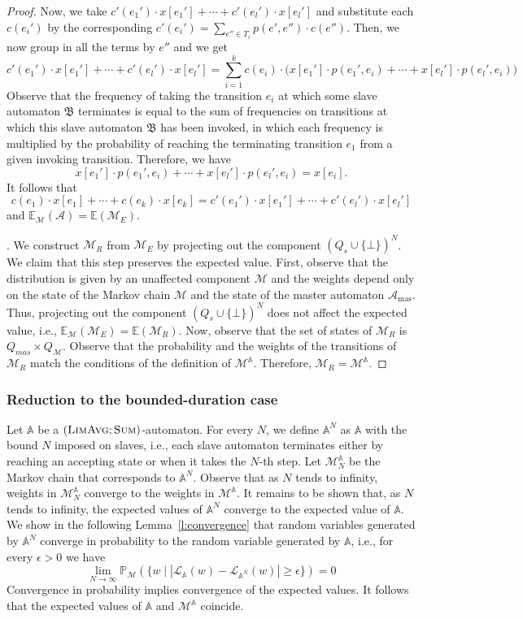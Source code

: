 \documentclass{lmcs}
\newcommand{\Paragraph}[1]{\noindent{\textbf{#1}}}
\newcommand{\masterA}{\mathcal{A}_{\textrm{mas}}}
\newcommand{\nestedA}{\mathbb{A}}
\newcommand{\slaveA}{{\mathfrak{B}}}
\newcommand{\nonnestedA}{\mathcal{A}}
\newcommand{\valueL}[1]{\mathcal{L}_{{#1}}}
\newcommand{\MCfromNested}{\markov^{\nestedA}}
\newcommand{\fsum}{\textsc{Sum}}
\newcommand{\flimavg}{\textsc{LimAvg}}
\newcommand{\probability}{\mathbb{P}}
\newcommand{\expected}{\mathbb{E}}
\newcommand{\markov}{\mathcal{M}}
\begin{document}
\begin{proof}
Now, we take  $c'(e_1') \cdot x[e_1'] + \cdots + c'(e_l') \cdot x[e_l']$ and substitute each $c(e_i')$ by
the corresponding $c'(e_i') = \sum_{e'' \in T_i} p(e',e'') \cdot  c(e'')$.
Then, we now group in all the terms by $e''$ and we get
\[
 c'(e_1') \cdot x[e_1'] + \cdots + c'(e_l') \cdot x[e_l'] = \sum_{i=1}^k c(e_i) \cdot \big(x[e_1'] \cdot p(e_1',e_i) + \cdots + x[e_l'] \cdot  p(e_l',e_i)\big)
\]
Observe that the frequency of taking the transition $e_i$ at which some slave automaton $\slaveA$ terminates is equal to the
sum of frequencies on transitions at which this slave automaton $\slaveA$ has been invoked, in which each frequency is multiplied by the probability of reaching
 the terminating transition $e_1$ from a given invoking transition.
Therefore, we have
\[
x[e_1'] \cdot  p(e_1',e_i) + \cdots + x[e_l']\cdot   p(e_l',e_i) = x[e_i].
\]
It follows that
\[ c(e_1) \cdot x[e_1] + \cdots + c(e_k) \cdot x[e_k] =
 c'(e_1') \cdot x[e_1'] + \cdots + c'(e_l') \cdot x[e_l']
\] and
$ \expected_{\markov}(\nonnestedA) = \expected (\markov_E)$.

\Paragraph{The Markov chain $\markov_R$}.
We construct $\markov_R$ from $\markov_E$ by projecting out the component ${(Q_s \cup \{\bot\})}^N$.
We claim that this step preserves the expected value.
First, observe that the distribution is given by an unaffected component $\markov$ and the weights depend only on
the state of the Markov chain $\markov$ and the state of the master automaton $\masterA$. Thus, projecting out
the component ${(Q_s \cup \{\bot\})}^N$ does not affect the expected value, i.e.,
$ \expected_{\markov}(\markov_E) = \expected (\markov_R)$. Now, observe that the set of states of $\markov_R$ is
$Q_{mas} \times Q_{\markov}$.
Observe that the probability and the weights of the transitions of $\markov_R$ match the conditions of the definition
of $\MCfromNested$. Therefore, $\markov_R = \MCfromNested$.
\end{proof}

\subsubsection{Reduction to the bounded-duration case}
Let $\nestedA$ be a $(\flimavg;\fsum)$-automaton.
For every $N$, we define $\nestedA^N$ as $\nestedA$ with the bound $N$ imposed on slaves, i.e.,
each slave automaton terminates either by reaching an accepting state or
when it takes the $N$-th step. Let $\MCfromNested_N$ be the Markov chain that corresponds to $\nestedA^N$.
Observe that as $N$ tends to infinity, weights in $\MCfromNested_N$ converge
to the weights in $\MCfromNested$. It remains to be shown that, as $N$ tends to
infinity, the expected values of $\nestedA^N$ converge to the expected value of $\nestedA$.
We show in the following Lemma~\ref{l:convergence} that random variables generated by
$\nestedA^N$ converge in probability to the random variable generated by $\nestedA$, i.e.,
 for every $\epsilon > 0$ we have
\[
\lim_{N \rightarrow \infty} \probability_{\markov}(\{ w \mid |\valueL{\nestedA}(w) - \valueL{\nestedA^N}(w)| \geq \epsilon \}) = 0
\]
Convergence in probability implies convergence of the expected values.
It follows that the expected values of
$\nestedA$ and $\MCfromNested$ coincide.
\end{document}
